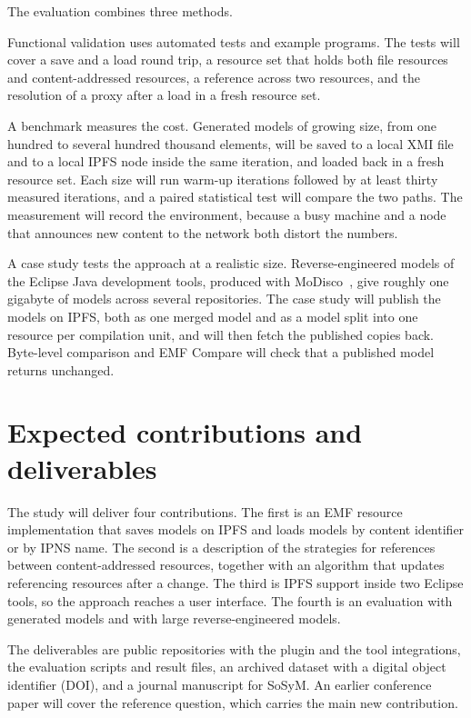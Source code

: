 \documentclass[11pt,a4paper]{article}
\begin{document}
The evaluation combines three methods.

Functional validation uses automated tests and example programs. The tests will cover a save and a load round trip, a resource set that holds both file resources and content-addressed resources, a reference across two resources, and the resolution of a proxy after a load in a fresh resource set.

A benchmark measures the cost. Generated models of growing size, from one hundred to several hundred thousand elements, will be saved to a local XMI file and to a local IPFS node inside the same iteration, and loaded back in a fresh resource set. Each size will run warm-up iterations followed by at least thirty measured iterations, and a paired statistical test will compare the two paths. The measurement will record the environment, because a busy machine and a node that announces new content to the network both distort the numbers.

A case study tests the approach at a realistic size. Reverse-engineered models of the Eclipse Java development tools, produced with MoDisco~\cite{bruneliere2014modisco}, give roughly one gigabyte of models across several repositories. The case study will publish the models on IPFS, both as one merged model and as a model split into one resource per compilation unit, and will then fetch the published copies back. Byte-level comparison and EMF Compare will check that a published model returns unchanged.

\section{Expected contributions and deliverables}

The study will deliver four contributions. The first is an EMF resource implementation that saves models on IPFS and loads models by content identifier or by IPNS name. The second is a description of the strategies for references between content-addressed resources, together with an algorithm that updates referencing resources after a change. The third is IPFS support inside two Eclipse tools, so the approach reaches a user interface. The fourth is an evaluation with generated models and with large reverse-engineered models.

The deliverables are public repositories with the plugin and the tool integrations, the evaluation scripts and result files, an archived dataset with a digital object identifier (DOI), and a journal manuscript for SoSyM. An earlier conference paper will cover the reference question, which carries the main new contribution.
\end{document}
